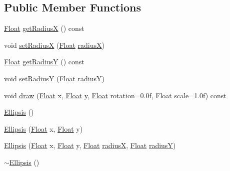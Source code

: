 \subsection*{Public Member Functions}
\begin{DoxyCompactItemize}
\item 
\hyperlink{namespaceZeta_a1e0a1265f9b3bd3075fb0fabd39088ba}{Float} \hyperlink{classZeta_1_1Ellipsis_a92dee9c33fbc459aae4125edf57a8ecd}{get\+Radius\+X} () const 
\item 
void \hyperlink{classZeta_1_1Ellipsis_a16632fc74a10cb7bac6488ae64e23f9c}{set\+Radius\+X} (\hyperlink{namespaceZeta_a1e0a1265f9b3bd3075fb0fabd39088ba}{Float} \hyperlink{classZeta_1_1Ellipsis_a9c875dc466b5880b11d808ad5e3bfb3c}{radius\+X})
\item 
\hyperlink{namespaceZeta_a1e0a1265f9b3bd3075fb0fabd39088ba}{Float} \hyperlink{classZeta_1_1Ellipsis_a4e3fb79c6be31636ae080441dc78ef0a}{get\+Radius\+Y} () const 
\item 
void \hyperlink{classZeta_1_1Ellipsis_a8e0c98ea0ba3645a73b939ad00782a81}{set\+Radius\+Y} (\hyperlink{namespaceZeta_a1e0a1265f9b3bd3075fb0fabd39088ba}{Float} \hyperlink{classZeta_1_1Ellipsis_aa6b5d0ee74c527d2be837dfbbbcfc0bb}{radius\+Y})
\item 
void \hyperlink{classZeta_1_1Ellipsis_a210b99ead8474b14bc95f89a4995ba9b}{draw} (\hyperlink{namespaceZeta_a1e0a1265f9b3bd3075fb0fabd39088ba}{Float} x, \hyperlink{namespaceZeta_a1e0a1265f9b3bd3075fb0fabd39088ba}{Float} y, \hyperlink{namespaceZeta_a1e0a1265f9b3bd3075fb0fabd39088ba}{Float} rotation=0.\+0f, Float scale=1.\+0f) const 
\item 
\hyperlink{classZeta_1_1Ellipsis_a819f892352d565bbabe21b617f66e2cd}{Ellipsis} ()
\item 
\hyperlink{classZeta_1_1Ellipsis_a07a716eb298028653e9c8d19adda7bf8}{Ellipsis} (\hyperlink{namespaceZeta_a1e0a1265f9b3bd3075fb0fabd39088ba}{Float} x, \hyperlink{namespaceZeta_a1e0a1265f9b3bd3075fb0fabd39088ba}{Float} y)
\item 
\hyperlink{classZeta_1_1Ellipsis_acff5f437b3e6dd03dc65f9d414d394c4}{Ellipsis} (\hyperlink{namespaceZeta_a1e0a1265f9b3bd3075fb0fabd39088ba}{Float} x, \hyperlink{namespaceZeta_a1e0a1265f9b3bd3075fb0fabd39088ba}{Float} y, \hyperlink{namespaceZeta_a1e0a1265f9b3bd3075fb0fabd39088ba}{Float} \hyperlink{classZeta_1_1Ellipsis_a9c875dc466b5880b11d808ad5e3bfb3c}{radius\+X}, \hyperlink{namespaceZeta_a1e0a1265f9b3bd3075fb0fabd39088ba}{Float} \hyperlink{classZeta_1_1Ellipsis_aa6b5d0ee74c527d2be837dfbbbcfc0bb}{radius\+Y})
\item 
\hyperlink{classZeta_1_1Ellipsis_a4cf61225956b97a0d5733a829291903d}{$\sim$\+Ellipsis} ()
\end{DoxyCompactItemize}
